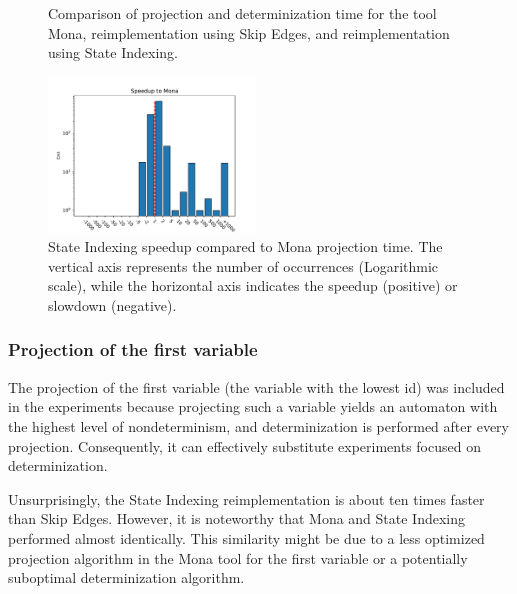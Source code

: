 \documentclass[pdflatex,sn-mathphys-num]{sn-jnl}%
\theoremstyle{thmstyleone}%
\theoremstyle{thmstyletwo}%
\theoremstyle{thmstylethree}%
\begin{document}
\begin{figure}[h!]
\begin{subfigure}{0.49\textwidth}
                \end{subfigure}
                \caption{Comparison of projection and determinization time for the tool Mona, reimplementation using Skip Edges, and reimplementation using State Indexing.}
                \label{figure:projection_last}
            \end{figure}
            \begin{figure}[h!]
                \centering
                \includegraphics[width=0.49\textwidth]{Figures/projection-last-speedup.pdf}
                \caption{State Indexing speedup compared to Mona projection time. The vertical axis represents the number of occurrences (Logarithmic scale), while the horizontal axis indicates the speedup (positive) or slowdown (negative).}
                \label{figure:projection_last_speedup}
            \end{figure}
        \subsubsection*{Projection of the first variable}
            The projection of the first variable (the variable with the lowest id) was included in the experiments because projecting such a variable yields an automaton with the highest level of nondeterminism, and determinization is performed after every projection. Consequently, it can effectively substitute experiments focused on determinization.

            Unsurprisingly, the State Indexing reimplementation is about ten times faster than Skip Edges. However, it is noteworthy that Mona and State Indexing performed almost identically. This similarity might be due to a less optimized projection algorithm in the Mona tool for the first variable or a potentially suboptimal determinization algorithm.
\end{document}
